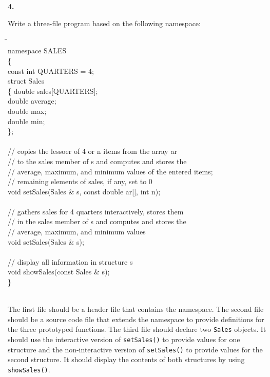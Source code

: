 \documentclass[10 pt]{amsart}
\newlength{\cwidth}
\newenvironment{cpart}[2][\cwidth]
	{\\ \noindent\phantom{\qquad}\textbf{#2. }\begin{minipage}[t]{#1}}
	{\end{minipage}}
\newcommand{\ttt}[1]{\texttt{#1}}
\begin{document}
	\begin{cpart}{4}
		Write a three-file program based on the following namespace:
		{\ttfamily
			\begin{tabbing}
				\phantom{\qquad}\=\phantom{\qquad}\=\phantom{\qquad}\= \\
					namespace SALES \\
					\{ \\
					\> 	const int QUARTERS = 4; \\
					\> 	struct Sales \\
					\> 	\{
					\> \>		double sales[QUARTERS]; \\
					\> \>		double average; \\
					\> \>		double max; \\
					\> \>		double min; \\
					\> 	\}; \\
					\\
					\> 	// copies the lessoer of 4 or n items from
								the array ar \\
					\> 	// to the sales member of s and computes 
								and stores the \\
					\> 	// average, maximum, and minimum values of the
								entered items; \\
					\> 	// remaining elements of sales, if any, set to 0 \\
					\> 	void setSales(Sales & s, const double ar[], int n); \\
					\\
					\> 	// gathers sales for 4 quarters interactively,
								stores them \\
					\> 	// in the sales member of s and computes and
								stores the \\
					\> 	// average, maximum, and minimum values \\
					\> 	void setSales(Sales & s); \\
					\\
					\> 	// display all information in structure s \\
					\> 	void showSales(const Sales & s); \\
					\}
			\end{tabbing}
		}
		\phantom{\quad} \\
		The first file should be a header file that contains the 
		namespace.
		The second file should be a source code file that extends the
		namespace to provide definitions for the three prototyped 
		functions.
		The third file should declare two \ttt{Sales} objects.
		It should use the interactive version of \ttt{setSales()}
		to provide values for one structure and the non-interactive
		version of \ttt{setSales()} to provide values for the second
		structure.
		It should display the contents of both structures by using
		\ttt{showSales()}.
	\end{cpart}
	\vspace{2ex}
\end{document}
